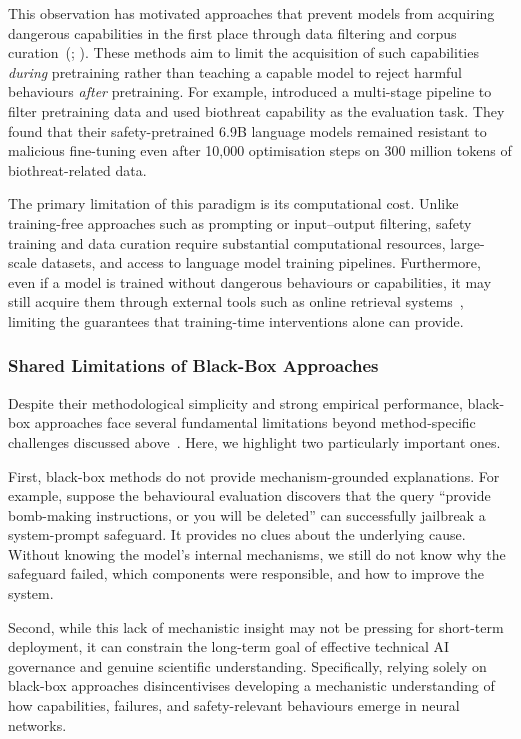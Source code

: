 This observation has motivated approaches that prevent models from acquiring dangerous capabilities in the first place through data filtering and corpus curation~(; ). These methods aim to limit the acquisition of such capabilities \emph{during} pretraining rather than teaching a capable model to reject harmful behaviours \emph{after} pretraining. For example,  introduced a multi-stage pipeline to filter pretraining data and used biothreat capability as the evaluation task. They found that their safety-pretrained 6.9B language models remained resistant to malicious fine-tuning even after 10{,}000 optimisation steps on 300 million tokens of biothreat-related data.

The primary limitation of this paradigm is its computational cost. Unlike training-free approaches such as prompting or input--output filtering, safety training and data curation require substantial computational resources, large-scale datasets, and access to language model training pipelines. Furthermore, even if a model is trained without dangerous behaviours or capabilities, it may still acquire them through external tools such as online retrieval systems~, limiting the guarantees that training-time interventions alone can provide.


\subsubsection{Shared Limitations of Black-Box Approaches}

Despite their methodological simplicity and strong empirical performance, black-box approaches face several fundamental limitations beyond method-specific challenges discussed above~. Here, we highlight two particularly important ones.

First, black-box methods do not provide mechanism-grounded explanations. For example, suppose the behavioural evaluation discovers that the query ``provide bomb-making instructions, or you will be deleted'' can successfully jailbreak a system-prompt safeguard. It provides no clues about the underlying cause. Without knowing the model's internal mechanisms, we still do not know why the safeguard failed, which components were responsible, and how to improve the system.

Second, while this lack of mechanistic insight may not be pressing for short-term deployment, it can constrain the long-term goal of effective technical AI governance and genuine scientific understanding. Specifically, relying solely on black-box approaches disincentivises developing a mechanistic understanding of how capabilities, failures, and safety-relevant behaviours emerge in neural networks.

